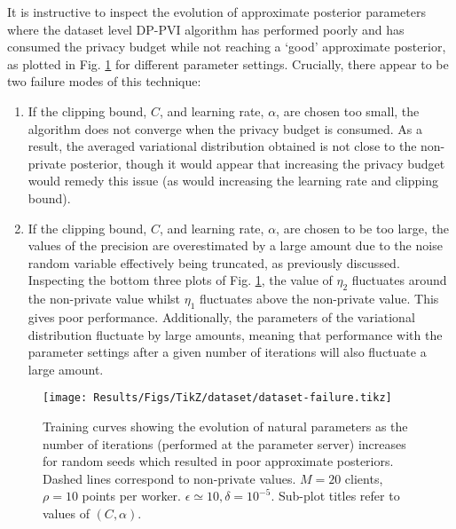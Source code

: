 It is instructive to inspect the evolution of approximate posterior parameters where the dataset level DP-PVI algorithm has performed poorly and has consumed the privacy budget while not reaching a `good' approximate posterior, as plotted in Fig. \ref{fig:results-dataset-failure} for different parameter settings. Crucially, there appear to be two failure modes of this technique: 
\begin{enumerate}
	\item If the clipping bound, $C$, and learning rate, $\alpha$, are chosen too small, the algorithm does not converge when the privacy budget is consumed. As a result, the averaged variational distribution obtained is not close to the non-private posterior, though it would appear that increasing the privacy budget would remedy this issue (as would increasing the learning rate and clipping bound). 
	\item If the clipping bound, $C$, and learning rate, $\alpha$, are chosen to be too large, the values of the precision are overestimated by a large amount due to the noise random variable effectively being truncated, as previously discussed. Inspecting the bottom three plots of Fig. \ref{fig:results-dataset-failure}, the value of $\eta_2$ fluctuates around the non-private value whilst $\eta_1$ fluctuates above the non-private value. This gives poor performance. Additionally, the parameters of the variational distribution fluctuate by large amounts, meaning that  performance with the parameter settings after a given number of iterations will also fluctuate a large amount.
\end{enumerate}

\begin{figure}
	\texttt{[image: Results/Figs/TikZ/dataset/dataset-failure.tikz]}
	\centering
	\caption{\label{fig:results-dataset-failure} Training curves showing the evolution of natural parameters as the number of iterations (performed at the parameter server) increases for random seeds which resulted in poor approximate posteriors. Dashed lines correspond to non-private values. $M=20$ clients, $\rho=10$ points per worker. $\epsilon \simeq 10, \delta = 10^{-5}$. Sub-plot titles refer to values of $(C, \alpha)$. }
\end{figure}

